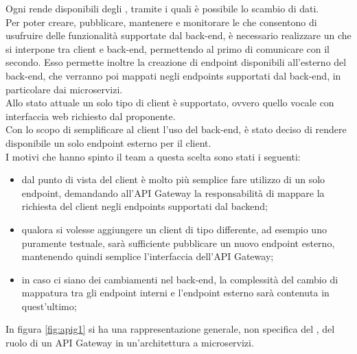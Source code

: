 Ogni  rende disponibili degli , tramite i quali è possibile lo scambio di dati. \\
Per poter creare, pubblicare, mantenere e monitorare le  che consentono di usufruire delle funzionalità supportate dal back-end, è necessario realizzare un  che si interpone tra client e back-end, permettendo al primo di comunicare con il secondo.
Esso permette inoltre la creazione di endpoint disponibili all'esterno del back-end, che verranno poi mappati negli endpoints supportati dal back-end, in particolare dai microservizi.\\
Allo stato attuale un solo tipo di client è supportato, ovvero quello vocale con interfaccia web richiesto dal proponente.\\
Con lo scopo di semplificare al client l'uso del back-end, è stato deciso di rendere disponibile un solo endpoint esterno per il client. \\
I motivi che hanno spinto il team a questa scelta sono stati i seguenti:
\begin{itemize}
	\item dal punto di vista del client è molto più semplice fare utilizzo di un solo endpoint, demandando all'API Gateway la responsabilità di mappare la richiesta del client negli endpoints supportati dal backend;
	\item qualora si volesse aggiungere un client di tipo differente, ad esempio uno puramente testuale, sarà sufficiente pubblicare un nuovo endpoint esterno, mantenendo quindi semplice l'interfaccia dell'API Gateway;
	\item in caso ci siano dei cambiamenti nel back-end, la complessità del cambio di mappatura tra gli endpoint interni e l'endpoint esterno sarà contenuta in quest'ultimo;
\end{itemize}

In figura \ref{fig:apig1} si ha una rappresentazione generale, non specifica del  \PROGETTO, del ruolo di un API Gateway in un'architettura a microservizi.\\

